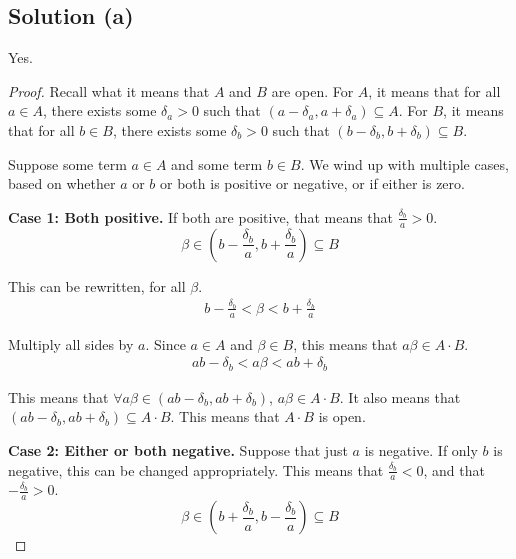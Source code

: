 \documentclass[12pt]{report}
\newenvironment{case}[2]{\par\textbf{Case #1: #2.}}{}
\begin{document}
    \subsection{Solution (a)}
        Yes.
        \begin{proof}
            Recall what it means that $A$ and $B$ are open.
            For $A$, it means that for all $a \in A$, there exists some $\delta_a > 0$ such that $(a - \delta_a, a + \delta_a) \subseteq A$.
            For $B$, it means that for all $b \in B$, there exists some $\delta_b > 0$ such that $(b - \delta_b, b + \delta_b) \subseteq B$.

            Suppose some term $a \in A$ and some term $b \in B$.
            We wind up with multiple cases, based on whether $a$ or $b$ or both is positive or negative, or if either is zero.
            \begin{case}{1}{Both positive}
                If both are positive, that means that $\frac{\delta_b}{a} > 0$.
                \begin{equation}
                    \beta \in \left(b - \frac{\delta_b}{a}, b + \frac{\delta_b}{a}\right) \subseteq B
                \end{equation}

                This can be rewritten, for all $\beta$.
                \begin{gather}
                    b - \frac{\delta_b}{a} < \beta < b + \frac{\delta_b}{a}
                \end{gather}

                Multiply all sides by $a$.
                Since $a \in A$ and $\beta \in B$, this means that $a\beta \in A \cdot B$.
                \begin{gather}
                    ab - \delta_b < a\beta < ab + \delta_b
                \end{gather}

                This means that $\forall a\beta \in \left( ab - \delta_b, ab + \delta_b \right)$, $a\beta \in A \cdot B$.
                It also means that $\left( ab - \delta_b, ab + \delta_b \right) \subseteq A \cdot B$.
                This means that $A \cdot B$ is open.
            \end{case}

            \begin{case}{2}{Either or both negative}
                Suppose that just $a$ is negative.
                If only $b$ is negative, this can be changed appropriately.
                This means that $\frac{\delta_b}{a} < 0$, and that $-\frac{\delta_b}{a} > 0$.
                \begin{equation}
                    \beta \in \left(b + \frac{\delta_b}{a}, b - \frac{\delta_b}{a}\right) \subseteq B
                \end{equation}


\end{case}
\end{proof}
\end{document}
